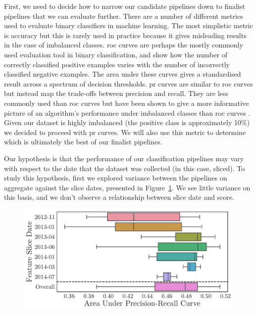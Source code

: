 \documentclass[../thesis/thesis.tex]{subfiles}
\begin{document}
First, we need to decide how to narrow our candidate pipelines down to finalist pipelines that we can evaluate further. There are a number of different metrics used to evaluate binary classifiers in machine learning. The most simplistic metric is accuracy but this is rarely used in practice because it gives misleading results in the case of imbalanced classes. \Gls{roc} curves are perhaps the mostly commonly used evaluation tool in binary classification, and show how the number of correctly classified positive examples varies with the number of incorrectly classified negative examples. The area under these curves gives a standardised result across a spectrum of decision thresholds. \Gls{pr} curves are similar to \gls{roc} curves but instead map the trade-offs between precision and recall. They are less commonly used than \gls{roc} curves but have been shown to give a more informative picture of an algorithm’s performance under imbalanced classes than \gls{roc} curves \cite{Jesse Davis 2006}. Given our dataset is highly imbalanced (the positive class is approximately 10\%) we decided to proceed with \gls{pr} curves. We will also use this metric to determine which is ultimately the best of our finalist pipelines.

Our hypothesis is that the performance of our classification pipelines may vary with respect to the date that the dataset was collected (in this case, sliced). To study this hypothesis, first we explored variance between the pipelines on aggregate against the slice dates, presented in Figure~\ref{fig:evaluation:selection_agg_slice}. We see little variance on this basis, and we don't observe a relationship between slice date and score.

\begin{figure}[!htb]
    \centering
    \includegraphics[width=\textwidth]{../figures/evaluation/selection_agg_slice}
    \caption[Pipeline performance by slice date]{}
    \label{fig:evaluation:selection_agg_slice}
\end{figure}
\end{document}
